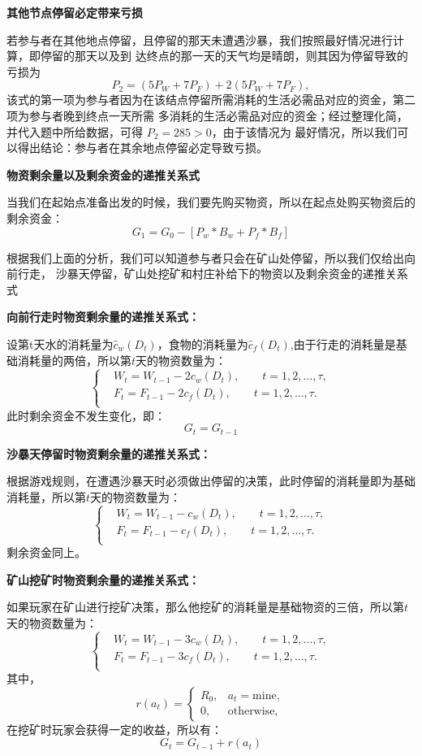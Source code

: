      \textbf{其他节点停留必定带来亏损}

    若参与者在其他地点停留，且停留的那天未遭遇沙暴，我们按照最好情况进行计算，即停留的那天以及到
    达终点的那一天的天气均是晴朗，则其因为停留导致的亏损为
    \[
    P_2 = \left(5P_W + 7P_F\right) + 2\left(5P_W + 7P_F\right),
    \]
    该式的第一项为参与者因为在该结点停留所需消耗的生活必需品对应的资金，第二项为参与者晚到终点一天所需
    多消耗的生活必需品对应的资金；经过整理化简，并代入题中所给数据，可得 $P_2 = 285 > 0$，由于该情况为
    最好情况，所以我们可以得出结论：参与者在其余地点停留必定导致亏损。

\noindent{} \textbf{物资剩余量以及剩余资金的递推关系式}

当我们在起始点准备出发的时候，我们要先购买物资，所以在起点处购买物资后的剩余资金：
\[
G_1 = G_0 - [P_w * B_w + P_f * B_f] 
\]

根据我们上面的分析，我们可以知道参与者只会在矿山处停留，所以我们仅给出向前行走，
%
沙暴天停留，矿山处挖矿和村庄补给下的物资以及剩余资金的递推关系式

 \textbf{向前行走时物资剩余量的递推关系式：}

设第t天水的消耗量为$\hat c_w(D_t)$，食物的消耗量为$\hat c_f(D_t)$,由于行走的消耗量是基础消耗量的两倍，所以第$t$天的物资数量为：
\[
\left\{
\begin{aligned}
&W_t=W_{t-1}-2c_w(D_t), \qquad t=1,2,\dots,\tau, \\[1mm]
&F_t=F_{t-1}-2c_f(D_t), \qquad t=1,2,\dots,\tau. \\[1mm]
\end{aligned}
\right.
\]
此时剩余资金不发生变化，即：
\[G_t = G_{t - 1}\]

 \textbf{沙暴天停留时物资剩余量的递推关系式：}

根据游戏规则，在遭遇沙暴天时必须做出停留的决策，此时停留的消耗量即为基础消耗量，所以第$t$天的物资数量为：
\[
\left\{
\begin{aligned}
&W_t=W_{t-1}-c_w(D_t), \qquad t=1,2,\dots,\tau, \\[1mm]
&F_t=F_{t-1}-c_f(D_t), \qquad t=1,2,\dots,\tau. \\[1mm]
\end{aligned}
\right.
\]
剩余资金同上。

 \textbf{矿山挖矿时物资剩余量的递推关系式：}

如果玩家在矿山进行挖矿决策，那么他挖矿的消耗量是基础物资的三倍，所以第$t$天的物资数量为：
\[
\left\{
\begin{aligned}
&W_t=W_{t-1}-3c_w(D_t), \qquad t=1,2,\dots,\tau, \\[1mm]
&F_t=F_{t-1}-3c_f(D_t), \qquad t=1,2,\dots,\tau. \\[1mm]
\end{aligned}
\right.
\]
其中，
\[
r(a_t)=
\begin{cases}
R_0, & a_t=\text{mine},\\
0, & \text{otherwise},
\end{cases}
\]
在挖矿时玩家会获得一定的收益，所以有：
\[G_t = G_{t - 1} + r(a_t)\]

